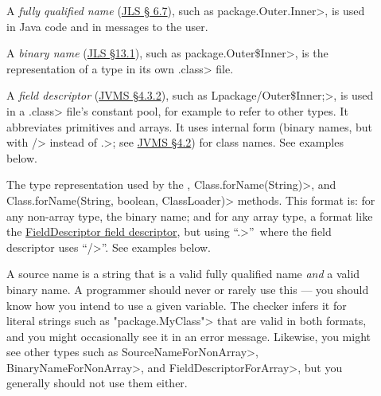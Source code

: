\begin{description}

\item[]
  A \emph{fully qualified name} (\href{https://docs.oracle.com/javase/specs/jls/se8/html/jls-6.html#jls-6.7}{JLS \S
    6.7}), such as
  \<package.Outer.Inner>, is used in Java code and in messages to
  the user.

\item[]
  A \emph{binary name} (\href{https://docs.oracle.com/javase/specs/jls/se8/html/jls-13.html#jls-13.1}{JLS \S 13.1}), such as
  \<package.Outer\$Inner>, is
  the representation of a type in its own \<.class> file.

\item[]
  A \emph{field descriptor} (\href{https://docs.oracle.com/javase/specs/jvms/se8/html/jvms-4.html#jvms-4.3.2}{JVMS \S 4.3.2}), such as
  \<Lpackage/Outer\$Inner;>, is used in a \<.class> file's constant pool,
  for example to refer to other types.  It abbreviates primitives and
  arrays.  It uses internal form (binary names, but with \</> instead of
  \<.>; see
  \href{https://docs.oracle.com/javase/specs/jvms/se8/html/jvms-4.html#jvms-4.2.1}{JVMS
    \S 4.2}) for class names.  See examples below.

\item[]
\begin{sloppypar}
  The type representation used by the
  , \<Class.forName(String)>,
  and \<Class.forName(String, boolean, ClassLoader)> methods.  This format
  is:  for any non-array type, the binary name; and for any array type, a
  format like the \href{https://docs.oracle.com/javase/specs/jvms/se8/html/jvms-4.html#jvms-4.3.2}{FieldDescriptor field descriptor}, but using
  ``\<.>''~where the field descriptor uses ``\</>''.  See examples below.
\end{sloppypar}

\item[]
  A source name is a string that is a valid fully qualified name \emph{and}
  a valid binary name.  A programmer should never or rarely use this --- you should
  know how you intend to use a given variable.  The checker infers it for
  literal strings such as \<"package.MyClass"> that are valid in both
  formats, and you might occasionally see it in an error message.
  Likewise, you might see other types such as \<SourceNameForNonArray>,
  \<BinaryNameForNonArray>, and \<FieldDescriptorForArray>, but you
  generally should not use them either.

\end{description}

